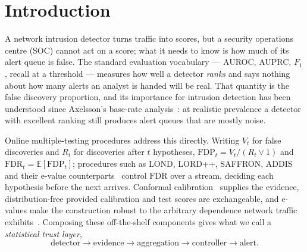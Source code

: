 \documentclass[conference]{IEEEtran}
\newcommand{\FDP}{\mathrm{FDP}}
\newcommand{\FDR}{\mathrm{FDR}}
\begin{document}
\begin{abstract}
report, and
$23$--$33$ for the episodes the canonical order detects at the primary window (all lower bounds). And the escape that conditions its spending index on observed
evidence exposes that index in closed form, letting an attacker silence ADDIS permanently --- shown
at a window whose evidence is \emph{not} a valid e-value and then reproduced on a synthetic stream
where ADDIS's guarantee does hold, and conspicuous in volume rather than cheap. Evaluated on
16,353,511 live-fire flows over five deployment windows, with a second detector and a second dataset
used to test whether the attack transfers, statistical trust layers
for security ML must be assessed not only for nominal error guarantees but for feasibility, semantic
granularity, and adversarial robustness.
\end{abstract}

\section{Introduction}\label{sec:intro}

A network intrusion detector turns traffic into scores, but a security operations centre (SOC)
cannot act on a score; what it needs to know is how much of its alert queue is
false. The standard evaluation vocabulary --- AUROC, AUPRC, $F_1$, recall
at a threshold --- measures how well a detector \emph{ranks} and says nothing about how many
alerts an analyst is handed will be real. That quantity is the false discovery proportion, and
its importance for intrusion detection has been understood since Axelsson's base-rate
analysis~\cite{axelsson1999baserate,axelsson2000baserate}: at realistic prevalence a detector with
excellent ranking still produces alert queues that are mostly noise.

Online multiple-testing procedures address this directly. Writing $V_t$ for false discoveries and
$R_t$ for discoveries after $t$ hypotheses, $\FDP_t = V_t/(R_t \vee 1)$ and
$\FDR_t = \mathbb{E}[\FDP_t]$; procedures such as LOND, LORD++, SAFFRON, ADDIS and their e-value
counterparts~\cite{javanmard2015lond,javanmard2018lord,ramdas2017lordpp,ramdas2018saffron,tian2019addis,xu2024elond}
control $\FDR$ over a stream, deciding each hypothesis before the next arrives. Conformal
calibration~\cite{vovk2005alrw,bates2023outliers} supplies the evidence, distribution-free
provided calibration and test scores are exchangeable, and e-values make the construction robust to
the arbitrary dependence network traffic
exhibits~\cite{vovk2021evalues,wang2022evaluebh}. Composing these off-the-shelf components gives
what we call a \emph{statistical trust layer},
\[
\text{detector} \to \text{evidence} \to \text{aggregation} \to \text{controller} \to
\text{alert}.
\]
\end{document}
